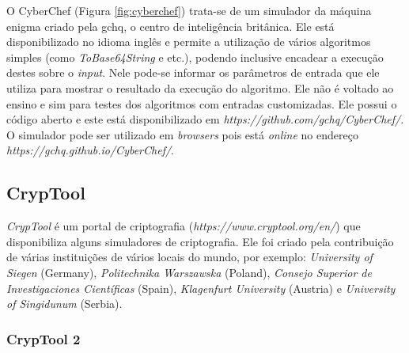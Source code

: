 O CyberChef (Figura \ref{fig:cyberchef}) trata-se de um simulador da máquina enigma criado pela \acrfull{gchq}, o centro de inteligência britânica. Ele está disponibilizado no idioma inglês e permite a utilização de vários algoritmos simples (como \textit{ToBase64String} e etc.), podendo inclusive encadear a execução destes sobre o \textit{input}. Nele pode-se informar os parâmetros de entrada que ele utiliza para mostrar o resultado da execução do algoritmo. Ele não é voltado ao ensino e sim para testes dos algoritmos com entradas customizadas. Ele possui o código aberto e este está disponibilizado em \textit{https://github.com/gchq/CyberChef/}. O simulador pode ser utilizado em \textit{browsers} pois está \textit{online} no endereço \textit{https://gchq.github.io/CyberChef/}. \cite{gchq20}


\subsection{CrypTool}

\textit{CrypTool} é um portal de criptografia (\textit{https://www.cryptool.org/en/}) que disponibiliza alguns simuladores de criptografia. Ele foi criado pela contribuição de várias instituições de vários locais do mundo, por exemplo: \textit{University of Siegen} (Germany), \textit{Politechnika Warszawska} (Poland), \textit{Consejo Superior de Investigaciones Científicas} (Spain), \textit{Klagenfurt University} (Austria) e \textit{University of Singidunum} (Serbia). \cite{cryptool20}

\subsubsection{CrypTool 2}

